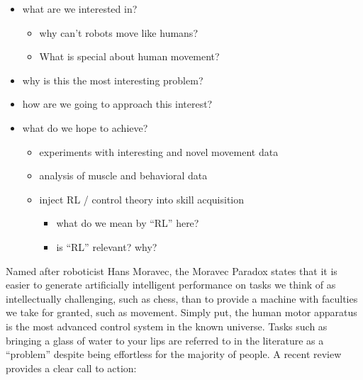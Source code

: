 {            \begin{itemize}
            \tightlist
            \item
              what are we interested in?

              \begin{itemize}
              \tightlist
              \item
                why can't robots move like humans?
              \item
                What is special about human movement?
              \end{itemize}
            \item
              why is this the most interesting problem?
            \item
              how are we going to approach this interest?
            \item
              what do we hope to achieve?

              \begin{itemize}
              \tightlist
              \item
                experiments with interesting and novel movement data
              \item
                analysis of muscle and behavioral data
              \item
                inject RL / control theory into skill acquisition

                \begin{itemize}
                \tightlist
                \item
                  what do we mean by ``RL'' here?
                \item
                  is ``RL'' relevant? why?
                \end{itemize}
              \end{itemize}
            \end{itemize}

            Named after roboticist Hans Moravec, the Moravec Paradox
            states that it is easier to generate artificially
            intelligent performance on tasks we think of as
            intellectually challenging, such as chess, than to provide a
            machine with faculties we take for granted, such as
            movement. Simply put, the human motor apparatus is the most
            advanced control system in the known universe. Tasks such as
            bringing a glass of water to your lips are referred to in
            the literature as a ``problem'' despite being effortless for
            the majority of people. A recent review provides a clear
            call to action:

}
